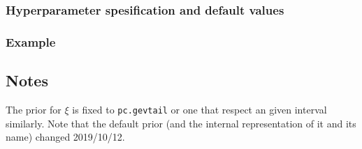 \documentclass[12pt]{article}
\begin{document}
\subsubsection*{Hyperparameter spesification and default values}


\subsubsection*{Example}


\subsection*{Notes}

The prior for $\xi$ is fixed to \texttt{pc.gevtail} or one that
respect an given interval similarly. Note that the default prior (and
the internal representation of it and its name) changed 2019/10/12.

        
\end{document}
